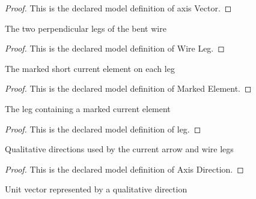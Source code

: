 \begin{proof}
  This is the declared model definition of axis Vector.
\end{proof}
\begin{definition}
  \label{def:physics:phyx-mini-0961:phyxminiproblems-problemphyxmini0961-wireleg}
  The two perpendicular legs of the bent wire
\end{definition}
\begin{proof}
  This is the declared model definition of Wire Leg.
\end{proof}
\begin{definition}
  \label{def:physics:phyx-mini-0961:phyxminiproblems-problemphyxmini0961-markedelement}
  The marked short current element on each leg
\end{definition}
\begin{proof}
  This is the declared model definition of Marked Element.
\end{proof}
\begin{definition}[leg]
  \label{def:physics:phyx-mini-0961:phyxminiproblems-problemphyxmini0961-markedelement-leg}
  The leg containing a marked current element
\end{definition}
\begin{proof}
  This is the declared model definition of leg.
\end{proof}
\begin{definition}
  \label{def:physics:phyx-mini-0961:phyxminiproblems-problemphyxmini0961-axisdirection}
  Qualitative directions used by the current arrow and wire legs
\end{definition}
\begin{proof}
  This is the declared model definition of Axis Direction.
\end{proof}
\begin{definition}
  \label{def:physics:phyx-mini-0961:phyxminiproblems-problemphyxmini0961-directionvector}
  Unit vector represented by a qualitative direction
\end{definition}
